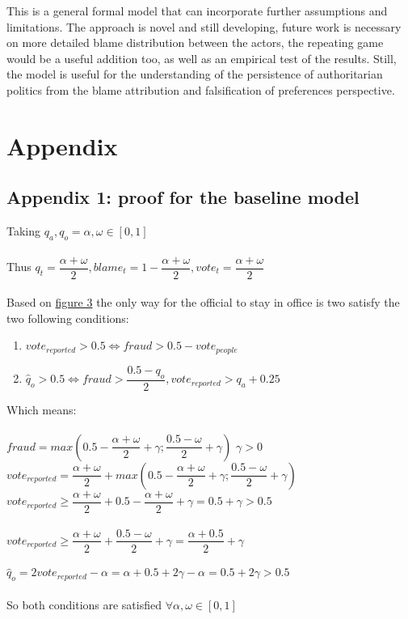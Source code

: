 \documentclass[a4paper, 12pt]{article}
\begin{document}
	This is a general formal model that can incorporate further assumptions and limitations. The approach is novel and still developing, future work is necessary on more detailed blame distribution between the actors, the repeating game would be a useful addition too, as well as an empirical test of the results. Still, the model is useful for the understanding of the persistence of authoritarian politics from the blame attribution and falsification of preferences perspective. 
	
	\newpage
	\section{Appendix}
    \subsection*{\hypertarget{app1}{Appendix 1}: proof for the baseline model}
    
    \noindent Taking $q_a, q_o = \alpha, \omega \in [0,1]$\\\\
    Thus $q_t = \dfrac{\alpha+\omega}{2}, blame_t = 1 - \dfrac{\alpha+\omega}{2}, vote_t = \dfrac{\alpha+\omega}{2}$\\\\
    Based on \hyperlink{fig3}{figure 3} the only way for the official to stay in office is two satisfy the two following conditions:
    \begin{enumerate}
        \item $vote_{reported} > 0.5 \Leftrightarrow fraud > 0.5 - vote_{people}$
        
        \item $\hat q_o > 0.5 \Leftrightarrow fraud > \dfrac{0.5 - q_o}{2}, vote_{reported} > q_a + 0.25$
        
    \end{enumerate}
    
    \noindent Which means:\\\\
    $fraud = max(0.5 - \dfrac{\alpha+\omega}{2} + \gamma; \dfrac{0.5 - \omega}{2} +\gamma)$ \textbar $\gamma > 0$\\
    $vote_{reported} = \dfrac{\alpha+\omega}{2} + max(0.5 - \dfrac{\alpha+\omega}{2} + \gamma; \dfrac{0.5 - \omega}{2} + \gamma)$\\
    $vote_{reported} \geq \dfrac{\alpha+\omega}{2} + 0.5 - \dfrac{\alpha+\omega}{2} + \gamma = 0.5 + \gamma > 0.5$ \\\\
    $vote_{reported} \geq \dfrac{\alpha+\omega}{2} + \dfrac{0.5 - \omega}{2} +\gamma = \dfrac{\alpha + 0.5}{2} + \gamma$\\\\
    $\hat q_o = 2 vote_{reported} - \alpha = \alpha + 0.5 + 2\gamma - \alpha = 0.5 + 2\gamma > 0.5$\\\\
    So both conditions are satisfied $\forall \alpha, \omega \in [0,1]$
    
\end{document}
